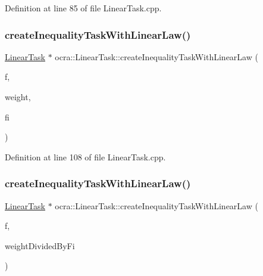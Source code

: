 Definition at line 85 of file Linear\+Task.\+cpp.

\hypertarget{classocra_1_1LinearTask_afe1724e6fe71b6d2e1dd7fe1cae882be}{}\label{classocra_1_1LinearTask_afe1724e6fe71b6d2e1dd7fe1cae882be} 
\subsubsection{\texorpdfstring{create\+Inequality\+Task\+With\+Linear\+Law()}{createInequalityTaskWithLinearLaw()}\hspace{0.1cm}{\footnotesize\ttfamily [4/5]}}
{\footnotesize\ttfamily \hyperlink{classocra_1_1LinearTask}{Linear\+Task} $\ast$ ocra\+::\+Linear\+Task\+::create\+Inequality\+Task\+With\+Linear\+Law (\begin{DoxyParamCaption}\item[{\hyperlink{classocra_1_1Function}{Function} $\ast$}]{f,  }\item[{const Vector\+Xd \&}]{weight,  }\item[{const Vector\+Xd \&}]{fi }\end{DoxyParamCaption})\hspace{0.3cm}{\ttfamily [static]}}



Definition at line 108 of file Linear\+Task.\+cpp.

\hypertarget{classocra_1_1LinearTask_af62a910012dbcd7583ac0e9536899836}{}\label{classocra_1_1LinearTask_af62a910012dbcd7583ac0e9536899836} 
\subsubsection{\texorpdfstring{create\+Inequality\+Task\+With\+Linear\+Law()}{createInequalityTaskWithLinearLaw()}\hspace{0.1cm}{\footnotesize\ttfamily [5/5]}}
{\footnotesize\ttfamily \hyperlink{classocra_1_1LinearTask}{Linear\+Task} $\ast$ ocra\+::\+Linear\+Task\+::create\+Inequality\+Task\+With\+Linear\+Law (\begin{DoxyParamCaption}\item[{\hyperlink{classocra_1_1Function}{Function} $\ast$}]{f,  }\item[{const Vector\+Xd \&}]{weight\+Divided\+By\+Fi }\end{DoxyParamCaption})\hspace{0.3cm}{\ttfamily [static]}}



